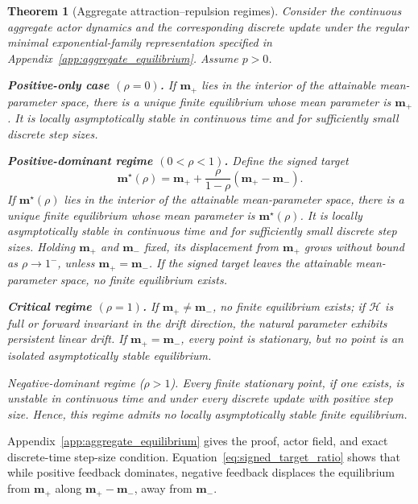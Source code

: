 \documentclass{article}
\theoremstyle{plain}
\newtheorem{theorem}{Theorem}[section]
\theoremstyle{definition}
\theoremstyle{remark}
\begin{document}
\begin{theorem}[Aggregate attraction--repulsion regimes]
\label{thm:aggregate_equilibria}
Consider the continuous aggregate actor dynamics and the corresponding
discrete update under the regular minimal exponential-family
representation specified in
Appendix~\ref{app:aggregate_equilibrium}. Assume \(p>0\).

\textbf{Positive-only case \((\rho=0)\).}
If \(\mathbf m_+\) lies in the interior of the attainable mean-parameter
space, there is a unique finite equilibrium whose mean parameter is
\(\mathbf m_+\). It is locally asymptotically stable in continuous time
and for sufficiently small discrete step sizes.

\textbf{Positive-dominant regime \((0<\rho<1)\).}
Define the signed target
\begin{equation}
    \mathbf m^\star(\rho)
    =
    \mathbf m_+
    +
    \frac{\rho}{1-\rho}
    \left(
        \mathbf m_+-\mathbf m_-
    \right).
    \label{eq:signed_target_ratio}
\end{equation}
If \(\mathbf m^\star(\rho)\) lies in the interior of the attainable
mean-parameter space, there is a unique finite equilibrium whose mean
parameter is \(\mathbf m^\star(\rho)\). It is locally asymptotically
stable in continuous time and for sufficiently small discrete step
sizes. Holding \(\mathbf m_+\) and \(\mathbf m_-\) fixed, its displacement
from \(\mathbf m_+\) grows without bound as \(\rho\to1^-\), unless
\(\mathbf m_+=\mathbf m_-\). If the signed target leaves the attainable
mean-parameter space, no finite equilibrium exists.

\textbf{Critical regime \((\rho=1)\).}
If \(\mathbf m_+\neq\mathbf m_-\), no finite equilibrium exists; if
\(\mathcal H\) is full or forward invariant in the drift direction, the
natural parameter exhibits persistent linear drift. If
\(\mathbf m_+=\mathbf m_-\), every point is stationary, but no point is
an isolated asymptotically stable equilibrium.

\textit{Negative-dominant regime (\(\rho>1\)).}
Every finite stationary point, if one exists, is unstable in continuous
time and under every discrete update with positive step size. Hence, this
regime admits no locally asymptotically stable finite equilibrium.
\end{theorem}

Appendix~\ref{app:aggregate_equilibrium} gives the proof, actor field, and exact
discrete-time step-size condition. Equation~\eqref{eq:signed_target_ratio} shows that while positive feedback
dominates, negative feedback displaces the equilibrium from \(\mathbf m_+\)
along \(\mathbf m_+-\mathbf m_-\), away from \(\mathbf m_-\).
\end{document}
